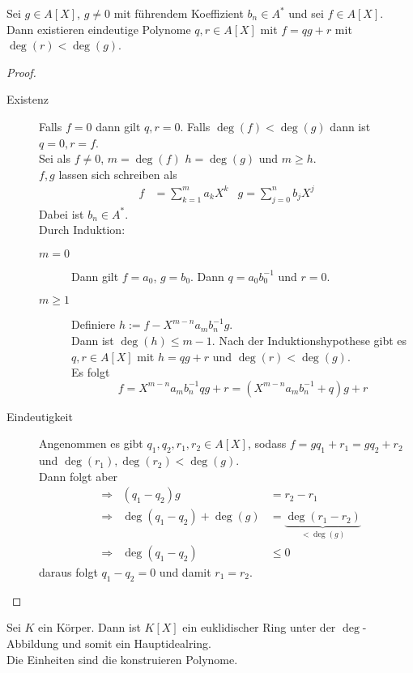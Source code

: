 	\begin{theorem}
		Sei $g\in A[X]$, $g\neq 0$ mit führendem Koeffizient $b_n\in A^*$ und sei $f\in A[X]$.\\
		Dann existieren eindeutige Polynome $q,r\in A[X]$ mit $f=qg+r$ mit $\deg(r)<\deg(g)$.
	\end{theorem}
	\begin{proof}
		\begin{description}
			\item[Existenz] Falls $f=0$ dann gilt $q,r=0$. Falls $\deg(f)<\deg(g)$ dann ist $q=0,r=f$.\\
			Sei als $f\neq 0$, $m=\deg(f)$ $h=\deg(g)$ und $m\geq h$.\\
			$f,g$ lassen sich schreiben als
			\begin{align*}
			f&=\sum_{k=1}^{m}a_kX^k& g=\sum_{j=0}^{n}b_jX^j
			\end{align*}
			Dabei ist $b_n\in A^*$.\\
			Durch Induktion:
			\begin{description}
				\item[$m=0$] Dann gilt $f=a_0$, $g=b_0$. Dann $q=a_0b_0^{-1}$ und $r=0$.
				\item[$m\geq 1$] Definiere $h:=f-X^{m-n}a_mb_n^{-1}g$.\\
				Dann ist $\deg(h)\leq m-1$. Nach der Induktionshypothese gibt es $q,r\in A[X]$ mit $h=qg+r$ und $\deg(r)<\deg(g)$.\\
				Es folgt
				\[f=X^{m-n}a_mb_n^{-1}qg+r=(X^{m-n}a_mb_n^{-1}+q)g+r\]
			\end{description}
			\item[Eindeutigkeit] Angenommen es gibt $q_1,q_2,r_1,r_2\in A[X]$, sodass $f=gq_1+r_1=gq_2+r_2$ und $\deg(r_1),\deg(r_2)<\deg(g)$.\\
			Dann folgt aber
			\begin{align*}
			&\Rightarrow&(q_1-q_2)g&=r_2-r_1\\
			&\Rightarrow&\deg(q_1-q_2)+\deg(g)&=\underbrace{\deg(r_1-r_2)}_{<\deg(g)}\\
			&\Rightarrow&\deg(q_1-q_2)&\leq 0
			\end{align*}
			daraus folgt $q_1-q_2=0$ und damit $r_1=r_2$.
		\end{description}
	\end{proof}

	\begin{kor}
		Sei $K$ ein Körper. Dann ist $K[X]$ ein euklidischer Ring unter der $\deg$-Abbildung und somit ein Hauptidealring.\\
		Die Einheiten sind die konstruieren Polynome.
	\end{kor}

